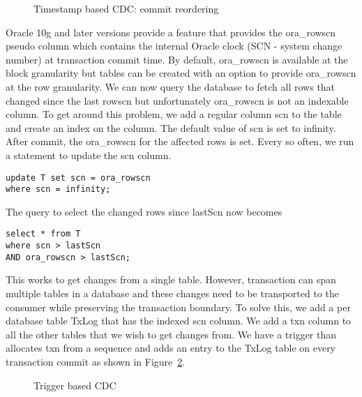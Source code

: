 \begin{figure}
\centering
{}
\vspace*{-2ex}
\caption{Timestamp based CDC: commit reordering}
\label{fig:tx1tx2}
\vspace*{-2ex}
\end{figure}
Oracle 10g and later versions provide a feature that provides the ora\_rowscn pseudo column which contains the internal Oracle clock (SCN - system change number) at transaction commit time. By default, ora\_rowscn is available at the block granularity but tables can be created with an option to provide ora\_rowscn at the row granularity. We can now query the database to fetch all rows that changed since the last rowscn but unfortunately ora\_rowscn is not an indexable column. To get around this problem, we add a regular column scn to the table and create an index on the column. The default value of scn is set to infinity. After commit, the ora\_rowscn for the affected rows is set. Every so often, we run a statement to update the scn column.

\begin{verbatim}
update T set scn = ora_rowscn
where scn = infinity;
\end{verbatim}

The query to select the changed rows since lastScn now becomes

\begin{verbatim}
select * from T 
where scn > lastScn 
AND ora_rowscn > lastScn;
\end{verbatim}

This works to get changes from a single table. However, transaction can span multiple tables in a database and these changes need to be transported to the consumer while preserving the transaction boundary. To solve this, we add a per database table TxLog that has the indexed scn column. We add a txn column to all the other tables that we wish to get changes from. We have a trigger than allocates txn from a sequence and adds an entry to the TxLog table on every transaction commit as shown in Figure~\ref{fig:txlog}. 

\begin{figure}
\centering
{}
\vspace*{-2ex}
\caption{Trigger based CDC}
\label{fig:txlog}
\vspace*{-2ex}
\end{figure}

